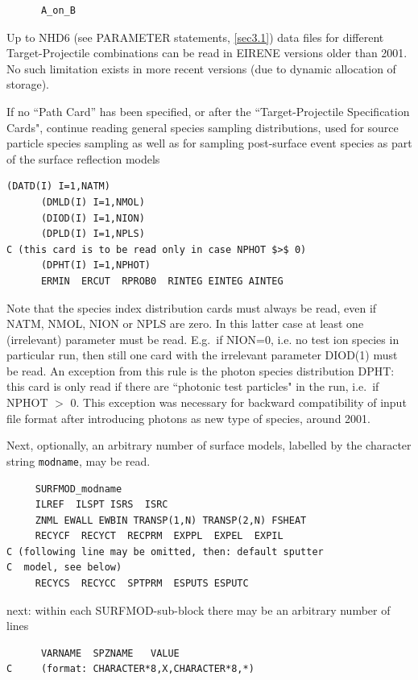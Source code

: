 \begin{lstlisting}
      A_on_B
\end{lstlisting} 

Up to NHD6 (see PARAMETER statements, \cref{sec3.1}) data files for different
Target-Projectile combinations can be read in EIRENE versions older than 2001.
No such limitation exists in more recent versions (due to dynamic allocation of
storage).

If no ``Path Card'' has been specified, or after the ``Target-Projectile
Specification Cards", continue reading general species sampling distributions,
used for source particle species sampling as well as for sampling post-surface
event species as part of the surface reflection models 

\begin{lstlisting}[texcl]
      (DATD(I) I=1,NATM)
      (DMLD(I) I=1,NMOL)
      (DIOD(I) I=1,NION)
      (DPLD(I) I=1,NPLS)
C (this card is to be read only in case NPHOT $>$ 0)
      (DPHT(I) I=1,NPHOT) 
      ERMIN  ERCUT  RPROB0  RINTEG EINTEG AINTEG
\end{lstlisting} 

Note that the species index distribution cards must always be read, even if
NATM, NMOL, NION or NPLS are zero.
In this latter case at least one (irrelevant) parameter must be read.
E.g.\ if NION=0, i.e. no test ion species in particular run, then still one
card with the irrelevant parameter DIOD(1) must be read.
An exception from this rule is the photon species distribution DPHT: this card
is only read if there are ``photonic test particles" in the run, i.e.\ if NPHOT
$>$ 0.
This exception was necessary for backward compatibility of input file format
after introducing photons as new type of species, around 2001.

Next, optionally, an arbitrary number of surface models, labelled by the
character string \lstinline|modname|, may be read.

\begin{lstlisting}
     SURFMOD_modname
     ILREF  ILSPT ISRS  ISRC
     ZNML EWALL EWBIN TRANSP(1,N) TRANSP(2,N) FSHEAT
     RECYCF  RECYCT  RECPRM  EXPPL  EXPEL  EXPIL
C (following line may be omitted, then: default sputter 
C  model, see below)
     RECYCS  RECYCC  SPTPRM  ESPUTS ESPUTC
\end{lstlisting}

next: within each SURFMOD-sub-block there may be an
arbitrary number of lines

\begin{lstlisting}
      VARNAME  SPZNAME   VALUE
C     (format: CHARACTER*8,X,CHARACTER*8,*)
\end{lstlisting}

